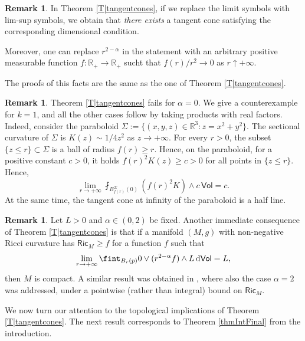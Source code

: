 \documentclass[10pt]{article}
\theoremstyle{definition}
\newtheorem{remark}[thm]{Remark}
\newcommand{\bb}[1]{\mathbb{#1}}
\newcommand{\ssf}[1]{\mathsf{#1}}
\newcommand{\Ric}{\mathsf{Ric}}
\newcommand{\de}{{\rm d}}
\begin{document}
\begin{remark} \label{R|extangent}
    In Theorem \ref{T|tangentcones}, if we replace the limit symbols with lim-sup symbols, we obtain that \emph{there exists} a tangent cone satisfying the corresponding dimensional condition. 

    Moreover, one can replace $r^{2-\alpha}$ in the statement with an arbitrary positive measurable function $f:\bb{R}_+ \to \bb{R}_+$ sucht that $f(r)/r^2 \to 0$ as $r \uparrow + \infty$.

    The proofs of this facts are the same as the one of Theorem \ref{T|tangentcones}.
\end{remark}

\begin{remark} \label{R3}
    Theorem \ref{T|tangentcones} fails for $\alpha=0$. We give a counterexample for $k=1$, and all the other cases follow by taking products with real factors. Indeed, consider the paraboloid $\Sigma:=\{(x,y,z) \in \bb{R}^3: z=x^2+y^2\}$. The sectional curvature of $\Sigma$ is $K(z) \sim 1/4z^2$ as $z \to + \infty$. For every $r>0$, the subset $\{z \leq r\} \subset \Sigma$ is a ball of radius $f(r) \geq r$. Hence, on the paraboloid, for a positive constant $c>0$, it holds $f(r)^2K(z) \geq c>0$ for all points in $\{z \leq r\}$. Hence, 
    \[
    \lim_{r \to + \infty} \fint_{B^{\Sigma}_{f(r)}(0)} (f(r)^2K) \wedge c \, \ssf{Vol} = c.
    \]
    At the same time, the tangent cone at infinity of the paraboloid is a half line.
\end{remark}

\begin{remark} \label{R4}
    Let $L>0$ and $\alpha \in (0,2)$ be fixed. Another immediate consequence of Theorem \ref{T|tangentcones} is that if a manifold $(M,g)$ with non-negative Ricci curvature has $\Ric_M \geq f $ for a function $f$ such that
    \[
    \lim_{r \to + \infty} \fint_{B_r(p)} 0 \vee (r^{2-\alpha}f) \wedge L \,\de\ssf{Vol}=L,
    \]
    then $M$ is compact. A similar result was obtained in \cite[Theorem 4.8]{CGT}, where also the case $\alpha=2$ was addressed, under a pointwise (rather than integral) bound on $\Ric_M$.
\end{remark}

We now turn our attention to the topological implications of Theorem \ref{T|tangentcones}. The next result corresponds to Theorem \ref{thmIntFinal} from the introduction.
\end{document}
